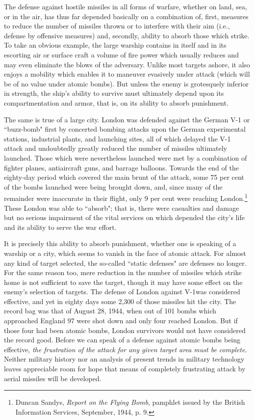 The defense against hostile missiles in all forms of warfare, whether on land, sea, or in the air, has thus far depended basically on a combination of, first, measures to reduce the number of missiles thrown or to interfere with their aim (i.e., defense by offensive measures) and, secondly, ability to absorb those which strike. To take an obvious example, the large warship contains in itself and in its escorting air or surface craft a volume of fire power which usually reduces and may even eliminate the blows of the adversary. Unlike most targets ashore, it also enjoys a mobility which enables it to maneuver evasively under attack (which will be of no value under atomic bombs). But unless the enemy is grotesquely inferior in strength, the ship's ability to survive must ultimately depend upon its compartmentation and armor, that is, on its ability to absorb punishment.

The same is true of a large city. London was defended against the German V-1 or ``buzz-bomb" first by concerted bombing attacks upon the German experimental stations, industrial plants, and launching sites, all of which delayed the V-1 attack and undoubtedly greatly reduced the number of missiles ultimately launched. Those which were nevertheless launched were met by a combination of fighter planes, antiaircraft guns, and barrage balloons. Towards the end of the eighty-day period which covered the main brunt of the attack, some 75 per cent of the bombs launched were being brought down, and, since many of the remainder were inaccurate in their flight, only 9 per cent were reaching London.\footnote{Duncan Sandys, \textit{Report on the Flying Bomb}, pamphlet issued by the British Information Services, September, 1944, p. 9.} These London was able to ``absorb"; that is, there were casualties and damage but no serious impairment of the vital services on which depended the city's life and its ability to serve the war effort.

It is precisely this ability to absorb punishment, whether one is speaking of a warship or a city, which seems to vanish in the face of atomic attack. For almost any kind of target selected, the so-called ``static defenses" are defenses no longer. For the same reason too, mere reduction in the number of missiles which strike home is not sufficient to save the target, though it may have some effect on the enemy's selection of targets. The defense of London against V-1was considered effective, and yet in eighty days some 2,300 of those missiles hit the city. The record bag was that of August 28, 1944, when out of 101 bombs which approached England 97 were shot down and only four reached London. But if those four had been atomic bombs, London survivors would not have considered the record good. Before we can speak of a defense against atomic bombs being effective, \label{I-frustrate} \emph{the frustration of the attack for any given target area must be complete}. Neither military history nor an analysis of present trends in military technology leaves appreciable room for hope that means of completely frustrating attack by aerial missiles will be developed.

